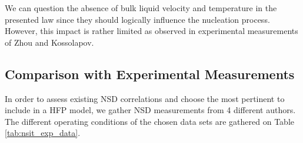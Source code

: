 \begin{remark*}{}
We can question the absence of bulk liquid velocity and temperature in the presented law since they should logically influence the nucleation process. However, this impact is rather limited as observed in experimental measurements of Zhou \etal and Kossolapov.
\end{remark*}

\subsection{Comparison with Experimental Measurements}

In order to assess existing NSD correlations and choose the most pertinent to include in a HFP model, we gather NSD measurements from 4 different authors. The different operating conditions of the chosen data sets are gathered on Table \ref{tab:nsit_exp_data}.


\begin{table}[h!]


\noindent{}

\caption{Nucleation Site Density data in flow boiling}
\label{tab:nsit_exp_data}


\end{table}



